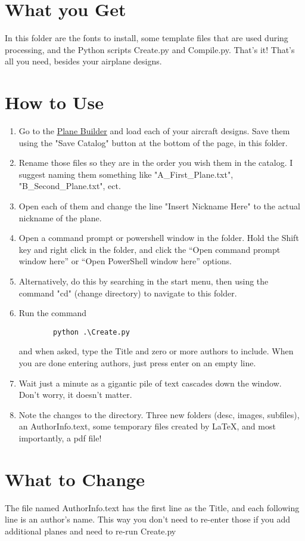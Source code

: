 \documentclass{article}
\begin{document}
\section{What you Get}
In this folder are the fonts to install, some template files that are used during processing, and the Python scripts Create.py and Compile.py.  That's it!  That's all you need, besides your airplane designs.
\section{How to Use}
\begin{enumerate}
    \item Go to the \href{https://tetragramm.github.io/PlaneBuilder/index.html}{\color{blue}\underline{Plane Builder}} and load each of your aircraft designs.  Save them using the "Save Catalog" button at the bottom of the page, in this folder.
    \item Rename those files so they are in the order you wish them in the catalog.  I suggest naming them something like "A\_First\_Plane.txt", "B\_Second\_Plane.txt", ect.
    \item Open each of them and change the line "Insert Nickname Here" to the actual nickname of the plane.
    \item Open a command prompt or powershell window in the folder.  Hold the Shift key and right click in the folder, and click the ``Open command prompt window here'' or ``Open PowerShell window here'' options.
    \item Alternatively, do this by searching in the start menu, then using the command "cd" (change directory) to navigate to this folder.
    \item Run the command \begin{verbatim}
        python .\Create.py
    \end{verbatim} and when asked, type the Title and zero or more authors to include. When you are done entering authors, just press enter on an empty line.
    \item Wait just a minute as a gigantic pile of text cascades down the window.  Don't worry, it doesn't matter.
    \item Note the changes to the directory.  Three new folders (desc, images, subfiles), an AuthorInfo.text, some temporary files created by \LaTeX, and most importantly, a pdf file!
\end{enumerate}

\section{What to Change}
The file named AuthorInfo.text has the first line as the Title, and each following line is an author's name.  This way you don't need to re-enter those if you add additional planes and need to re-run Create.py
\end{document}
